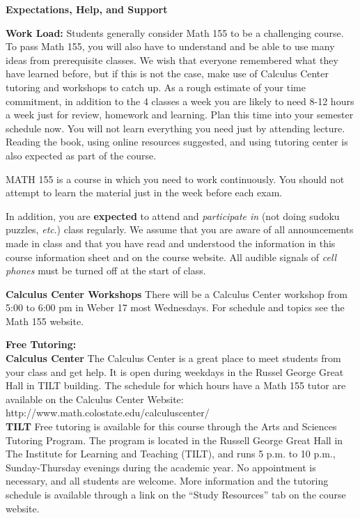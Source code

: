 \documentclass[11pt]{article}
\begin{document}
\vspace{1cm}


\noindent \textsf{\large{\textbf{Expectations, Help, and Support}}}

\vspace{3mm}

\noindent \textbf{Work Load:}  Students generally consider Math 155  to be a challenging course.  To pass Math 155, you will also have to understand and be able to use many ideas from prerequisite classes. We wish that everyone remembered what they have learned before, but if this is not the case, make use of Calculus Center tutoring and workshops to catch up. As a rough estimate of your time commitment, in addition to the 4 classes a week you are likely to need 8-12 hours a week just for review, homework and learning. Plan this time into your semester schedule now. You will not learn everything you need just by attending lecture. Reading the book, using online resources suggested, and using tutoring center is also expected as part of the course. 

MATH 155 is a course in which you need to work continuously.  You should not attempt to learn the material
just in the week before each exam.

\vspace{3mm}

In addition, you are \textbf{expected} to attend and \textit{participate in} (not doing sudoku puzzles, \textit{etc}.) class regularly.  We assume that you are aware of all announcements made in class and that you have read and understood the information in this course information sheet and on the course website.  All audible signals of \textit{cell phones}  must be turned off at the start of class. 

\vspace{1cm}

\textbf{Calculus Center Workshops} There will be a Calculus Center workshop from 5:00 to 6:00 pm in Weber 17 most Wednesdays. For schedule and topics see the Math 155 website.
\vspace{1cm}


\noindent \textbf{Free Tutoring:} \\
\textbf{Calculus Center} 
The Calculus Center is a great place to meet students from your class and get help. It is open during weekdays in the Russel George Great Hall in TILT building. The schedule for which hours have a Math 155 tutor are available on the Calculus Center Website: http://www.math.colostate.edu/calculuscenter/
\\
\textbf{TILT} Free tutoring is available for this course through the Arts and Sciences Tutoring Program. The program is located in the Russell George Great Hall in The Institute for Learning and Teaching (TILT), and runs 5 p.m. to 10 p.m., Sunday-Thursday evenings during the academic year. No appointment is necessary, and all students are welcome. More information and the tutoring schedule is available through a link on the ``Study Resources'' tab on the course website. %
\end{document}
